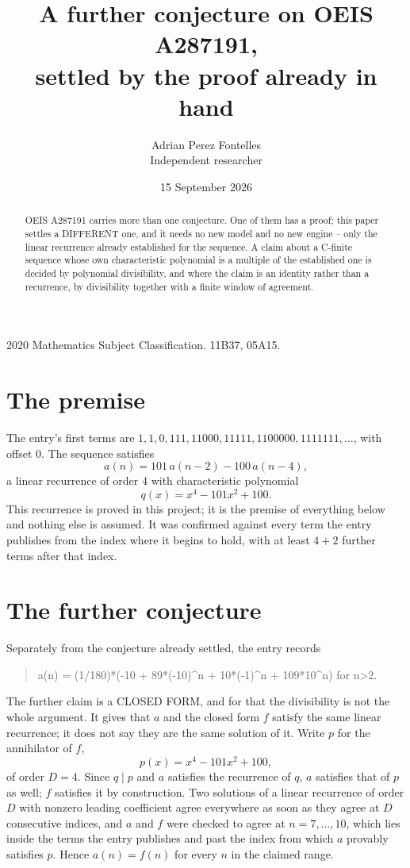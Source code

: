 \documentclass[11pt,a4paper]{article}
\title{A further conjecture on OEIS A287191,\\ \large settled by the proof already in hand}
\author{Adrian Perez Fontelles\\ \small Independent researcher}
\date{15 September 2026}
\theoremstyle{plain}
\theoremstyle{definition}
\begin{document}
\maketitle

\begin{abstract}
OEIS A287191 carries more than one conjecture. One of them has a proof; this paper settles a
DIFFERENT one, and it needs no new model and no new engine -- only the linear recurrence already
established for the sequence. A claim about a C-finite sequence whose own characteristic
polynomial is a multiple of the established one is decided by polynomial divisibility, and where
the claim is an identity rather than a recurrence, by divisibility together with a finite window
of agreement.
\end{abstract}

\noindent\small 2020 Mathematics Subject Classification. 11B37, 05A15.\normalsize

\section{The premise}

The entry's first terms are $1, 1, 0, 111, 11000, 11111, 1100000, 1111111,\dots$, with offset $0$. The sequence satisfies
\[
  a(n)=101\,a(n-2) - 100\,a(n-4) ,
\]
a linear recurrence of order $4$ with characteristic polynomial
\[
  q(x)=x^{4} - 101 x^{2} + 100 .
\]
This recurrence is proved in this project; it is the premise of everything below and nothing else is assumed.
It was confirmed against every term the entry publishes from the index where it begins to hold,
with at least $4+2$ further terms after that index.

\section{The further conjecture}

Separately from the conjecture already settled, the entry records

\begin{quote}\raggedright a(n) = (1/180)*(-10 + 89*(-10)\^{}n + 10*(-1)\^{}n + 109*10\^{}n) for n>2.\end{quote}

The further claim is a CLOSED FORM, and for that the divisibility is not the whole argument. It
gives that $a$ and the closed form $f$ satisfy the same linear recurrence; it does not say they
are the same solution of it. Write $p$ for the annihilator of $f$,
\[
  p(x)=x^{4} - 101 x^{2} + 100 ,
\]
of order $D=4$. Since $q\mid p$ and $a$ satisfies the recurrence of $q$, $a$ satisfies that of
$p$ as well; $f$ satisfies it by construction. Two solutions of a linear recurrence of order $D$
with nonzero leading coefficient agree everywhere as soon as they agree at $D$ consecutive
indices, and $a$ and $f$ were checked to agree at $n=7,\dots,10$,
which lies inside the terms the entry publishes and past the index from which $a$ provably
satisfies $p$. Hence $a(n)=f(n)$ for every $n$ in the claimed range.
\end{document}
